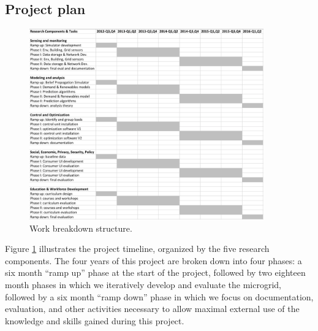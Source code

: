 
\subsection{Project plan}

\begin{figure}[th!]
  \begin{center}
   \includegraphics[width=0.9\textwidth]{fig/sep-timeline.eps}
   \caption{Work breakdown structure.}
  \label{fig:timeline}
  \end{center}
\end{figure}

Figure \ref{fig:timeline} illustrates the project timeline, organized by
the five research components.  The four years of this project are broken
down into four phases: a six month ``ramp up'' phase at the start of the
project, followed by two eighteen month phases in which we iteratively
develop and evaluate the microgrid, followed by a six month ``ramp down''
phase in which we focus on documentation, evaluation, and other activities
necessary to allow maximal external use of the knowledge and skills gained
during this project. 


